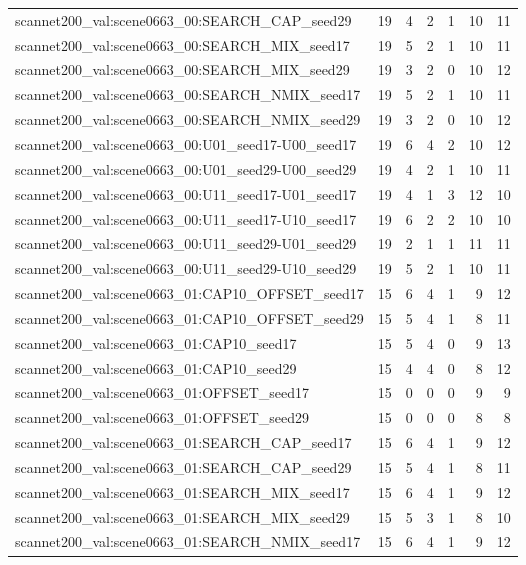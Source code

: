 \begin{table}[t]
\begin{tabular}{lrrrrrr}
scannet200\_val:scene0663\_00:SEARCH\_CAP\_seed29 & 19 & 4 & 2 & 1 & 10 & 11 \\
scannet200\_val:scene0663\_00:SEARCH\_MIX\_seed17 & 19 & 5 & 2 & 1 & 10 & 11 \\
scannet200\_val:scene0663\_00:SEARCH\_MIX\_seed29 & 19 & 3 & 2 & 0 & 10 & 12 \\
scannet200\_val:scene0663\_00:SEARCH\_NMIX\_seed17 & 19 & 5 & 2 & 1 & 10 & 11 \\
scannet200\_val:scene0663\_00:SEARCH\_NMIX\_seed29 & 19 & 3 & 2 & 0 & 10 & 12 \\
scannet200\_val:scene0663\_00:U01\_seed17-U00\_seed17 & 19 & 6 & 4 & 2 & 10 & 12 \\
scannet200\_val:scene0663\_00:U01\_seed29-U00\_seed29 & 19 & 4 & 2 & 1 & 10 & 11 \\
scannet200\_val:scene0663\_00:U11\_seed17-U01\_seed17 & 19 & 4 & 1 & 3 & 12 & 10 \\
scannet200\_val:scene0663\_00:U11\_seed17-U10\_seed17 & 19 & 6 & 2 & 2 & 10 & 10 \\
scannet200\_val:scene0663\_00:U11\_seed29-U01\_seed29 & 19 & 2 & 1 & 1 & 11 & 11 \\
scannet200\_val:scene0663\_00:U11\_seed29-U10\_seed29 & 19 & 5 & 2 & 1 & 10 & 11 \\
scannet200\_val:scene0663\_01:CAP10\_OFFSET\_seed17 & 15 & 6 & 4 & 1 & 9 & 12 \\
scannet200\_val:scene0663\_01:CAP10\_OFFSET\_seed29 & 15 & 5 & 4 & 1 & 8 & 11 \\
scannet200\_val:scene0663\_01:CAP10\_seed17 & 15 & 5 & 4 & 0 & 9 & 13 \\
scannet200\_val:scene0663\_01:CAP10\_seed29 & 15 & 4 & 4 & 0 & 8 & 12 \\
scannet200\_val:scene0663\_01:OFFSET\_seed17 & 15 & 0 & 0 & 0 & 9 & 9 \\
scannet200\_val:scene0663\_01:OFFSET\_seed29 & 15 & 0 & 0 & 0 & 8 & 8 \\
scannet200\_val:scene0663\_01:SEARCH\_CAP\_seed17 & 15 & 6 & 4 & 1 & 9 & 12 \\
scannet200\_val:scene0663\_01:SEARCH\_CAP\_seed29 & 15 & 5 & 4 & 1 & 8 & 11 \\
scannet200\_val:scene0663\_01:SEARCH\_MIX\_seed17 & 15 & 6 & 4 & 1 & 9 & 12 \\
scannet200\_val:scene0663\_01:SEARCH\_MIX\_seed29 & 15 & 5 & 3 & 1 & 8 & 10 \\
scannet200\_val:scene0663\_01:SEARCH\_NMIX\_seed17 & 15 & 6 & 4 & 1 & 9 & 12 \\

\end{tabular}
\end{table}
